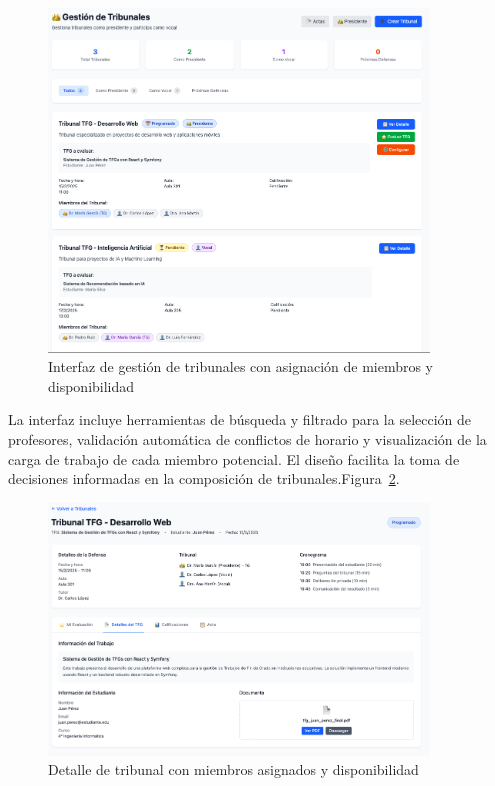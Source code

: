 \documentclass[12pt,a4paper,oneside]{report}
\begin{document}
\begin{figure}[H]
\centering
\includegraphics[width=0.9\textwidth]{processed/images/gestion_tribunales.png}
\caption{Interfaz de gestión de tribunales con asignación de miembros y disponibilidad}
\label{fig:gestion-tribunales}
\end{figure}

La interfaz incluye herramientas de búsqueda y filtrado para la selección de profesores, validación automática de conflictos de horario y visualización de la carga de trabajo de cada miembro potencial. El diseño facilita la toma de decisiones informadas en la composición de tribunales.Figura~\ref{fig:detalle-tribunales}.

\begin{figure}[H]
\centering
\includegraphics[width=0.9\textwidth]{processed/images/detalle_tribunales.png}
\caption{Detalle de tribunal con miembros asignados y disponibilidad}
\label{fig:detalle-tribunales}
\end{figure}
\end{document}
